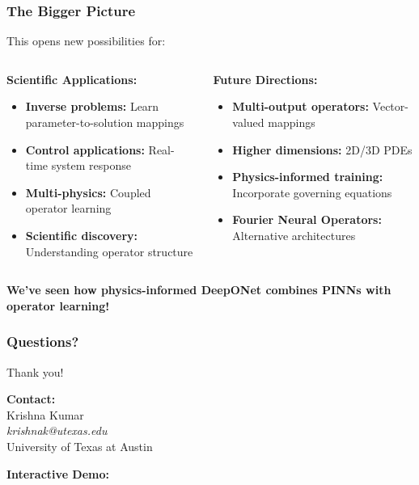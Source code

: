 \documentclass[notes]{beamer}
\begin{document}
\begin{frame}
\frametitle{The Bigger Picture}

This opens new possibilities for:

\begin{columns}[T]
    \begin{column}{0.5\textwidth}
        \textbf{Scientific Applications:}
        \begin{itemize}
            \item \textbf{Inverse problems:} Learn parameter-to-solution mappings
            \item \textbf{Control applications:} Real-time system response
            \item \textbf{Multi-physics:} Coupled operator learning
            \item \textbf{Scientific discovery:} Understanding operator structure
        \end{itemize}
    \end{column}
    \begin{column}{0.5\textwidth}
        \textbf{Future Directions:}
        \begin{itemize}
            \item \textbf{Multi-output operators:} Vector-valued mappings
            \item \textbf{Higher dimensions:} 2D/3D PDEs
            \item \textbf{Physics-informed training:} Incorporate governing equations
            \item \textbf{Fourier Neural Operators:} Alternative architectures
        \end{itemize}
    \end{column}
\end{columns}

\vspace{1cm}

\begin{center}
\textbf{We've seen how physics-informed DeepONet combines PINNs with operator learning!}
\end{center}

\end{frame}

\begin{frame}
\frametitle{Questions?}

\centering
\Large Thank you!

\vspace{2cm}

\textbf{Contact:} \\
Krishna Kumar \\
\textit{krishnak@utexas.edu} \\
University of Texas at Austin

\vspace{1cm}

\textbf{Interactive Demo:} \\
\href{https://colab.research.google.com/github/kks32-courses/ut-portugal-sciml/blob/main/docs/02-deeponet/deeponet.ipynb}{}

\end{frame}
\end{document}
